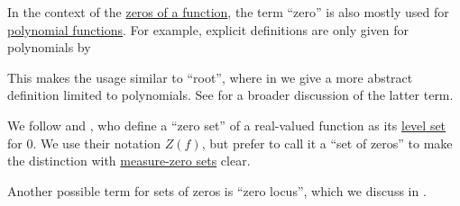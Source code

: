 \begin{remark}\label{rem:zero_of_function_terminology}
  In the context of the \hyperref[def:zero_of_function]{zeros of a function}, the term \enquote{zero} is also mostly used for \hyperref[con:evaluation_homomorphism]{polynomial functions}. For example, explicit definitions are only given for polynomials by

  This makes the usage similar to \enquote{root}, where in  we give a more abstract definition limited to polynomials. See  for a broader discussion of the latter term.

  We follow  and , who define a \enquote{zero set} of a real-valued function as its \hyperref[def:level_set]{level set} for \( 0 \). We use their notation \( Z(f) \), but prefer to call it a \enquote{set of zeros} to make the distinction with \hyperref[con:measure_zero_set]{measure-zero sets} clear.

  Another possible term for sets of zeros is \enquote{zero locus}, which we discuss in .
\end{remark}

